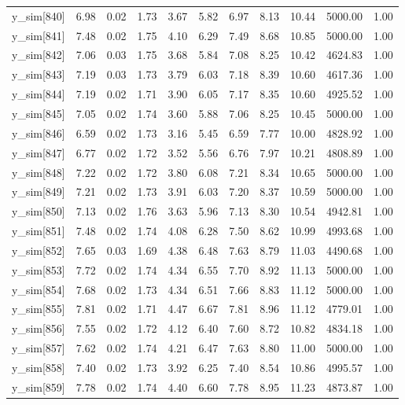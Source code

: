 \begin{table}[ht]
\begin{tabular}{rrrrrrrrrrr}
  y\_sim[840] & 6.98 & 0.02 & 1.73 & 3.67 & 5.82 & 6.97 & 8.13 & 10.44 & 5000.00 & 1.00 \\ 
  y\_sim[841] & 7.48 & 0.02 & 1.75 & 4.10 & 6.29 & 7.49 & 8.68 & 10.85 & 5000.00 & 1.00 \\ 
  y\_sim[842] & 7.06 & 0.03 & 1.75 & 3.68 & 5.84 & 7.08 & 8.25 & 10.42 & 4624.83 & 1.00 \\ 
  y\_sim[843] & 7.19 & 0.03 & 1.73 & 3.79 & 6.03 & 7.18 & 8.39 & 10.60 & 4617.36 & 1.00 \\ 
  y\_sim[844] & 7.19 & 0.02 & 1.71 & 3.90 & 6.05 & 7.17 & 8.35 & 10.60 & 4925.52 & 1.00 \\ 
  y\_sim[845] & 7.05 & 0.02 & 1.74 & 3.60 & 5.88 & 7.06 & 8.25 & 10.45 & 5000.00 & 1.00 \\ 
  y\_sim[846] & 6.59 & 0.02 & 1.73 & 3.16 & 5.45 & 6.59 & 7.77 & 10.00 & 4828.92 & 1.00 \\ 
  y\_sim[847] & 6.77 & 0.02 & 1.72 & 3.52 & 5.56 & 6.76 & 7.97 & 10.21 & 4808.89 & 1.00 \\ 
  y\_sim[848] & 7.22 & 0.02 & 1.72 & 3.80 & 6.08 & 7.21 & 8.34 & 10.65 & 5000.00 & 1.00 \\ 
  y\_sim[849] & 7.21 & 0.02 & 1.73 & 3.91 & 6.03 & 7.20 & 8.37 & 10.59 & 5000.00 & 1.00 \\ 
  y\_sim[850] & 7.13 & 0.02 & 1.76 & 3.63 & 5.96 & 7.13 & 8.30 & 10.54 & 4942.81 & 1.00 \\ 
  y\_sim[851] & 7.48 & 0.02 & 1.74 & 4.08 & 6.28 & 7.50 & 8.62 & 10.99 & 4993.68 & 1.00 \\ 
  y\_sim[852] & 7.65 & 0.03 & 1.69 & 4.38 & 6.48 & 7.63 & 8.79 & 11.03 & 4490.68 & 1.00 \\ 
  y\_sim[853] & 7.72 & 0.02 & 1.74 & 4.34 & 6.55 & 7.70 & 8.92 & 11.13 & 5000.00 & 1.00 \\ 
  y\_sim[854] & 7.68 & 0.02 & 1.73 & 4.34 & 6.51 & 7.66 & 8.83 & 11.12 & 5000.00 & 1.00 \\ 
  y\_sim[855] & 7.81 & 0.02 & 1.71 & 4.47 & 6.67 & 7.81 & 8.96 & 11.12 & 4779.01 & 1.00 \\ 
  y\_sim[856] & 7.55 & 0.02 & 1.72 & 4.12 & 6.40 & 7.60 & 8.72 & 10.82 & 4834.18 & 1.00 \\ 
  y\_sim[857] & 7.62 & 0.02 & 1.74 & 4.21 & 6.47 & 7.63 & 8.80 & 11.00 & 5000.00 & 1.00 \\ 
  y\_sim[858] & 7.40 & 0.02 & 1.73 & 3.92 & 6.25 & 7.40 & 8.54 & 10.86 & 4995.57 & 1.00 \\ 
  y\_sim[859] & 7.78 & 0.02 & 1.74 & 4.40 & 6.60 & 7.78 & 8.95 & 11.23 & 4873.87 & 1.00 \\ 

\end{tabular}
\end{table}
